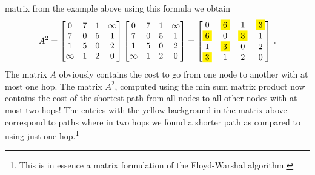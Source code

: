 matrix from the example above using this formula we obtain
\begin{equation*}
  A^2 =
  \begin{bmatrix}    
    0 & 7 & 1 & \infty \\
    7 & 0 & 5 & 1 \\
    1 & 5 & 0 & 2 \\
    \infty & 1 & 2 & 0
  \end{bmatrix}
  \begin{bmatrix}    
    0 & 7 & 1 & \infty \\
    7 & 0 & 5 & 1 \\
    1 & 5 & 0 & 2 \\
    \infty & 1 & 2 & 0
  \end{bmatrix}
  =
  \begin{bmatrix}    
    0 & \colorbox{yellow}{6} & 1 & \colorbox{yellow}{3} \\
    \colorbox{yellow}{6} & 0 & \colorbox{yellow}{3} & 1 \\
    1 & \colorbox{yellow}{3} & 0 & 2 \\
    \colorbox{yellow}{3} & 1 & 2 & 0
  \end{bmatrix}\,.
\end{equation*}
The matrix $A$ obviously contains the cost to go from one node to
another with at most one hop. The matrix $A^2$, computed using the min
sum matrix product now contains the cost of the shortest path from all
nodes to all other nodes with at most two hops! The entries with the
yellow background in the matrix above correspond to paths where in two
hops we found a shorter path as compared to using just one
hop.\footnote{This is in essence a matrix formulation of the
  Floyd-Warshal algorithm.}

